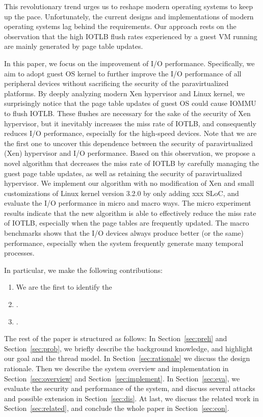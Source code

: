 
This revolutionary trend urges us to reshape modern operating systems to keep up the pace. Unfortunately, the current designs and implementations of modern operating systems lag behind the requirements.
Our approach rests on the observation that the high IOTLB flush rates experienced by a guest VM running 
are mainly generated by page table updates. 


In this paper, we focus on the improvement of I/O performance. Specifically, we aim to adopt guest OS kernel to further improve the I/O performance of all peripheral devices without sacrificing the security of the paravirtualized platforms. By deeply analyzing modern Xen hypervisor and Linux kernel, we surprisingly notice that the page table updates of guest OS could cause IOMMU to flush IOTLB. These flushes are necessary for the sake of the security of Xen hypervisor, but it inevitably increases the miss rate of IOTLB, and consequently reduces I/O performance, especially for the high-speed devices. Note that we are the first one to uncover this dependence between the security of paravirtualized (Xen) hypervisor and I/O performance. Based on this observation, we propose a novel algorithm that decreases the miss rate of IOTLB by carefully managing the guest page table updates, as well as retaining the security of paravirtualized hypervisor.
We implement our algorithm with no modification of Xen and small customizations of Linux kernel version 3.2.0 by only adding xxx SLoC, and evaluate the I/O performance in micro and macro ways. The micro experiment results indicate that the new algorithm is able to effectively reduce the miss rate of IOTLB, especially when the page tables are frequently updated. The macro benchmarks shows that the I/O devices always produce better (or the same) performance, especially when the system frequently generate many temporal processes.


In particular, we make the following contributions:
\begin{enumerate}
\item We are the first to identify the  
\item .
\item .
\end{enumerate}

The rest of the paper is structured as follows: In Section~\ref{sec:preli} and Section~\ref{sec:prob}, we briefly describe the background knowledge, and highlight our goal and the thread model. In Section~\ref{sec:rationale} we discuss the design rationale. Then we describe the system overview and implementation in Section~\ref{sec:overview} and Section~\ref{sec:implement}. In Section~\ref{sec:eva}, we evaluate the security and performance of the system, and discuss several attacks and possible extension in Section~\ref{sec:dis}. At last, we discuss the related work in Section~\ref{sec:related}, and conclude the whole paper in Section~\ref{sec:con}. 
